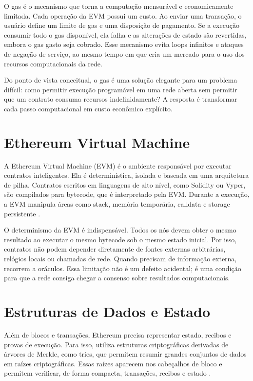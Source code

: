 \documentclass[12pt,a4paper]{report}
\begin{document}
O gas é o mecanismo que torna a computação mensurável e economicamente limitada. Cada operação da EVM possui um custo. Ao enviar uma transação, o usuário define um limite de gas e uma disposição de pagamento. Se a execução consumir todo o gas disponível, ela falha e as alterações de estado são revertidas, embora o gas gasto seja cobrado. Esse mecanismo evita loops infinitos e ataques de negação de serviço, ao mesmo tempo em que cria um mercado para o uso dos recursos computacionais da rede.

Do ponto de vista conceitual, o gas é uma solução elegante para um problema difícil: como permitir execução programável em uma rede aberta sem permitir que um contrato consuma recursos indefinidamente? A resposta é transformar cada passo computacional em custo econômico explícito.

\section{Ethereum Virtual Machine}

A Ethereum Virtual Machine (EVM) é o ambiente responsável por executar contratos inteligentes. Ela é determinística, isolada e baseada em uma arquitetura de pilha. Contratos escritos em linguagens de alto nível, como Solidity ou Vyper, são compilados para bytecode, que é interpretado pela EVM. Durante a execução, a EVM manipula áreas como stack, memória temporária, calldata e storage persistente \cite{Bashir2023}.

O determinismo da EVM é indispensável. Todos os nós devem obter o mesmo resultado ao executar o mesmo bytecode sob o mesmo estado inicial. Por isso, contratos não podem depender diretamente de fontes externas arbitrárias, relógios locais ou chamadas de rede. Quando precisam de informação externa, recorrem a oráculos. Essa limitação não é um defeito acidental; é uma condição para que a rede consiga chegar a consenso sobre resultados computacionais.

\section{Estruturas de Dados e Estado}

Além de blocos e transações, Ethereum precisa representar estado, recibos e provas de execução. Para isso, utiliza estruturas criptográficas derivadas de árvores de Merkle, como tries, que permitem resumir grandes conjuntos de dados em raízes criptográficas. Essas raízes aparecem nos cabeçalhos de bloco e permitem verificar, de forma compacta, transações, recibos e estado \cite{Bashir2023}.
\end{document}
